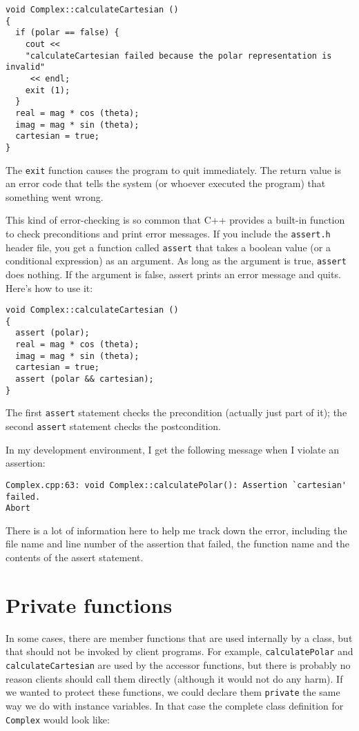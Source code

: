 \begin{lstlisting}
void Complex::calculateCartesian ()
{
  if (polar == false) {
    cout <<
    "calculateCartesian failed because the polar representation is invalid"
	 << endl;
    exit (1);
  }
  real = mag * cos (theta);
  imag = mag * sin (theta);
  cartesian = true;
}
\end{lstlisting}
%
The {\tt exit} function causes the program to quit immediately.  The
return value is an error code that tells the system (or whoever
executed the program) that something went wrong.


This kind of error-checking is so common that C++ provides
a built-in function to check preconditions and print error messages.
If you include the {\tt assert.h} header file, you get a function
called {\tt assert} that takes a boolean value (or a conditional
expression) as an argument.  As long as the argument is true,
{\tt assert} does nothing.  If the argument is false, assert
prints an error message and quits.  Here's how to use it:

\begin{lstlisting}
void Complex::calculateCartesian ()
{
  assert (polar);
  real = mag * cos (theta);
  imag = mag * sin (theta);
  cartesian = true;
  assert (polar && cartesian);
}
\end{lstlisting}
%
The first {\tt assert} statement checks the precondition
(actually just part of it); the second {\tt assert} statement
checks the postcondition.

In my development environment, I get the following message
when I violate an assertion:

\begin{lstlisting}
Complex.cpp:63: void Complex::calculatePolar(): Assertion `cartesian' failed.
Abort
\end{lstlisting}
%
There is a lot of information here to help me track down the error,
including the file name and line number of the assertion that
failed, the function name and the contents of the assert statement.


\section{Private functions}

In some cases, there are member functions that are used internally
by a class, but that should not be invoked by client programs.
For example, {\tt calculatePolar} and {\tt calculateCartesian}
are used by the accessor functions, but there is probably no
reason clients should call them directly (although it would not
do any harm).  If we wanted to protect these functions, we
could declare them {\tt private} the same way we do with instance
variables.  In that case the complete class definition for
{\tt Complex} would look like:

